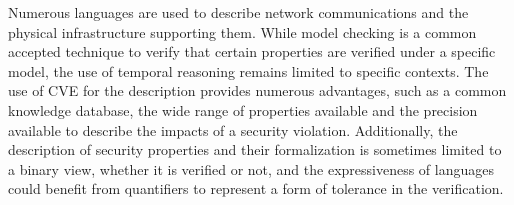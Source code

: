 Numerous languages are used to describe network communications and the physical infrastructure supporting them. While model checking is a common accepted technique to verify that certain properties are verified under a specific model, the use of temporal reasoning remains limited to specific contexts.
The use of CVE for the description provides numerous advantages, such as a common knowledge database, the wide range of properties available and the precision available to describe the impacts of a security violation.
Additionally, the description of security properties and their formalization is sometimes limited to a binary view, whether it is verified or not, and the expressiveness of languages could benefit from quantifiers to represent a form of tolerance in the verification.